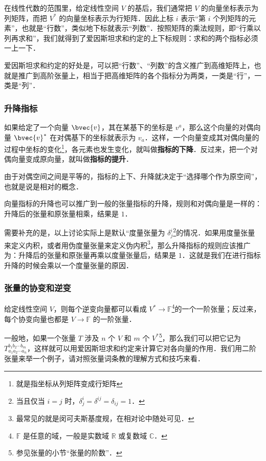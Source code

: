 在线性代数的范围里，给定线性空间 $V$ 的基后，我们通常把 $V$ 的向量坐标表示为列矩阵，而把 $V^*$ 的向量坐标表示为行矩阵．因此上标 $i$ 表示“第 $i$ 个列矩阵的元素”，也就是“行数”，类似地下标就表示“列数”．按照矩阵的乘法规则，即“行乘以列再求和”，我们就得到了爱因斯坦求和约定的上下标规则：求和的两个指标必须一上一下．

爱因斯坦求和约定的好处是，可以把“行数”、“列数”的含义推广到高维矩阵上，也就是推广到高阶张量上，相当于把高维矩阵的各个指标分为两类，一类是“行”，一类是“列”．

\subsubsection{升降指标}

如果给定了一个向量 $\bvec{v}$，其在某基下的坐标是 $v^a$，那么这个向量的对偶向量 $\bvec{v}^*$ 在对偶基下的坐标就表示为 $v_a$．这样，一个向量变成其对偶向量的过程中坐标的变化\footnote{就是指坐标从列矩阵变成行矩阵}，各元素也发生变化，就叫做\textbf{指标的下降}．反过来，把一个对偶向量变成原向量，就叫做\textbf{指标的提升}．

由于对偶空间之间是平等的，指标的上下、升降就决定于“选择哪个作为原空间”，也就是说是相对的概念．

向量指标的升降也可以推广到一般的张量指标的升降，规则和对偶向量是一样的：升降后的张量和原张量相乘，结果是 $1$．

需要补充的是，以上讨论实际上是默认“度量张量为 $\delta^i_j$\footnote{当且仅当 $i=j$ 时，$\delta^i_j=\delta^{ij}=\delta_{ij}=1$．}的情况．如果用度量张量来定义内积，或者用伪度量张量来定义伪内积\footnote{最常见的就是闵可夫斯基度规，在相对论中随处可见．}，那么升降指标的规则应该推广为：升降后的张量和原张量再乘以度量张量后，结果是 $1$．这就是我们在进行指标升降的时候会乘以一个度量张量的原因．

\subsubsection{张量的协变和逆变}

给定线性空间 $V$，则每个逆变向量都可以看成 $V^*\rightarrow \mathbb{F}$\footnote{$\mathbb{F}$ 是任意的域，一般是实数域 $\mathbb{R}$ 或复数域 $\mathbb{C}$．}的一个一阶张量；反过来，每个协变向量也都是 $V\rightarrow \mathbb{F}$ 的一阶张量．

一般地，如果一个张量 $T$ 涉及 $n$ 个 $V$ 和 $m$ 个 $V^*$\footnote{参见张量的小节“张量的阶数”．}，那么我们可以把它记为 $T^{b_1b_2\cdots b_m}_{a_1a_2\cdots a_n}$，这样就可以用爱因斯坦求和约定来计算它对各向量的作用．我们用二阶张量来举一个例子，请对照张量词条教的理解方式和技巧来看．

